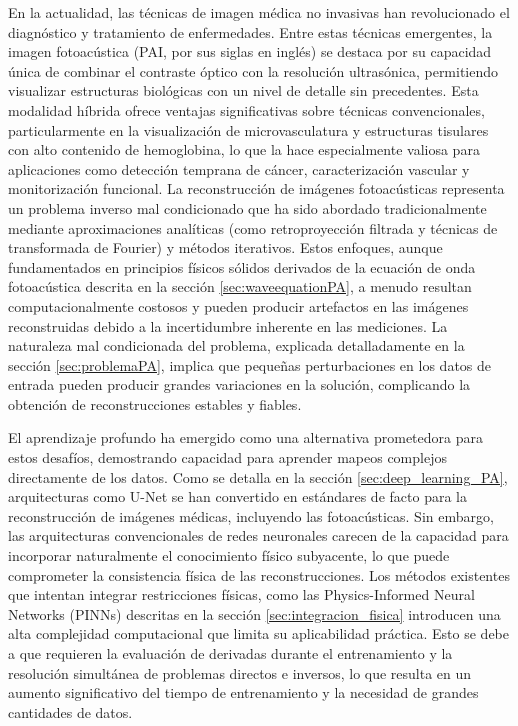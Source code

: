 En la actualidad, las técnicas de imagen médica no invasivas han revolucionado el diagnóstico y tratamiento de enfermedades. Entre estas técnicas emergentes, la imagen fotoacústica (PAI, por sus siglas en inglés) se destaca por su capacidad única de combinar el contraste óptico con la resolución ultrasónica, permitiendo visualizar estructuras biológicas con un nivel de detalle sin precedentes. Esta modalidad híbrida ofrece ventajas significativas sobre técnicas convencionales, particularmente en la visualización de microvasculatura y estructuras tisulares con alto contenido de hemoglobina, lo que la hace especialmente valiosa para aplicaciones como detección temprana de cáncer, caracterización vascular y monitorización funcional.
La reconstrucción de imágenes fotoacústicas representa un problema inverso mal condicionado que ha sido abordado tradicionalmente mediante aproximaciones analíticas (como retroproyección filtrada y técnicas de transformada de Fourier) y métodos iterativos. Estos enfoques, aunque fundamentados en principios físicos sólidos derivados de la ecuación de onda fotoacústica descrita en la sección \ref{sec:waveequationPA}, a menudo resultan computacionalmente costosos y pueden producir artefactos en las imágenes reconstruidas debido a la incertidumbre inherente en las mediciones. La naturaleza mal condicionada del problema, explicada detalladamente en la sección \ref{sec:problemaPA}, implica que pequeñas perturbaciones en los datos de entrada pueden producir grandes variaciones en la solución, complicando la obtención de reconstrucciones estables y fiables.

El aprendizaje profundo ha emergido como una alternativa prometedora para estos desafíos, demostrando capacidad para aprender mapeos complejos directamente de los datos. Como se detalla en la sección \ref{sec:deep_learning_PA}, arquitecturas como U-Net se han convertido en estándares de facto para la reconstrucción de imágenes médicas, incluyendo las fotoacústicas. Sin embargo, las arquitecturas convencionales de redes neuronales carecen de la capacidad para incorporar naturalmente el conocimiento físico subyacente, lo que puede comprometer la consistencia física de las reconstrucciones. Los métodos existentes que intentan integrar restricciones físicas, como las Physics-Informed Neural Networks (PINNs) descritas en la sección \ref{sec:integracion_fisica} introducen una alta complejidad computacional que limita su aplicabilidad práctica. Esto se debe a que requieren la evaluación de derivadas durante el entrenamiento y la resolución simultánea de problemas directos e inversos, lo que resulta en un aumento significativo del tiempo de entrenamiento y la necesidad de grandes cantidades de datos.

